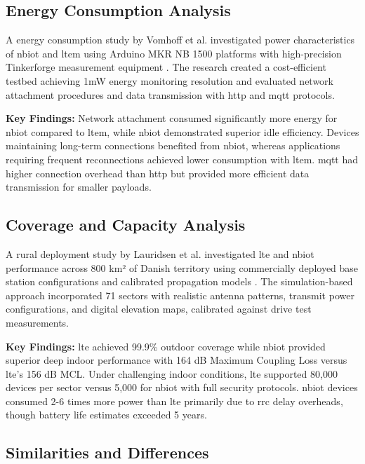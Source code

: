 \documentclass[12pt, english, openany]{book}
\begin{document}
\subsection{Energy Consumption Analysis}

A energy consumption study by Vomhoff et al. investigated power characteristics of \gls{nbiot} and \gls{ltem} using Arduino MKR NB 1500 platforms with high-precision Tinkerforge measurement equipment \parencite{related_work_energy_consumption}. The research created a cost-efficient testbed achieving 1mW energy monitoring resolution and evaluated network attachment procedures and data transmission with \gls{http} and \gls{mqtt} protocols.

\textbf{Key Findings:} Network attachment consumed significantly more energy for \gls{nbiot} compared to \gls{ltem}, while \gls{nbiot} demonstrated superior idle efficiency. Devices maintaining long-term connections benefited from \gls{nbiot}, whereas applications requiring frequent reconnections achieved lower consumption with \gls{ltem}. \gls{mqtt} had higher connection overhead than \gls{http} but provided more efficient data transmission for smaller payloads.

\subsection{Coverage and Capacity Analysis}

A rural deployment study by Lauridsen et al. investigated \gls{lte} and \gls{nbiot} performance across 800 km² of Danish territory using commercially deployed base station configurations and calibrated propagation models \parencite{related_work_coverage_capacity}. The simulation-based approach incorporated 71 sectors with realistic antenna patterns, transmit power configurations, and digital elevation maps, calibrated against drive test measurements.

\textbf{Key Findings:} \gls{lte} achieved 99.9\% outdoor coverage while \gls{nbiot} provided superior deep indoor performance with 164 dB Maximum Coupling Loss versus \gls{lte}'s 156 dB MCL. Under challenging indoor conditions, \gls{lte} supported 80,000 devices per sector versus 5,000 for \gls{nbiot} with full security protocols. \gls{nbiot} devices consumed 2-6 times more power than \gls{lte} primarily due to \gls{rrc} delay overheads, though battery life estimates exceeded 5 years.

\subsection{Similarities and Differences}
\end{document}
